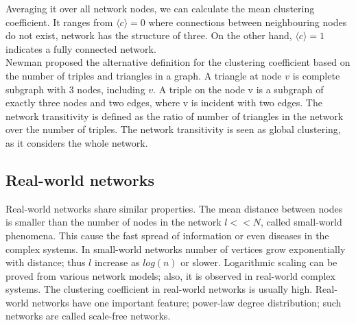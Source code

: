 Averaging it over all network nodes, we can calculate the mean clustering coefficient. It ranges from  $\langle c \rangle = 0$ where connections between neighbouring nodes do not exist, network has the structure of three. On the other hand, $\langle c \rangle = 1$ indicates a fully connected network. \\

Newman proposed the alternative definition for the clustering coefficient based on the number of triples and triangles in a graph. A triangle at node $v$ is complete subgraph with 3 nodes, including $v$. A triple on the node v is a subgraph of exactly three nodes and two edges, where v is incident with two edges. The network transitivity is defined as the ratio of number of triangles in the network over the number of triples. The network transitivity is seen as global clustering, as it considers the whole network.  




\subsection{Real-world networks}
Real-world networks share similar properties. The mean distance between nodes is smaller than the number of nodes in the network $l << N$, called small-world phenomena. This cause the fast spread of information or even diseases in the complex systems. In small-world networks number of vertices grow exponentially with distance; thus $l$ increase as $log(n)$ or slower. Logarithmic scaling can be proved from various network models; also, it is observed in real-world complex systems. The clustering coefficient in real-world networks is usually high. Real-world networks have one important feature; power-law degree distribution; such networks are called scale-free networks.

